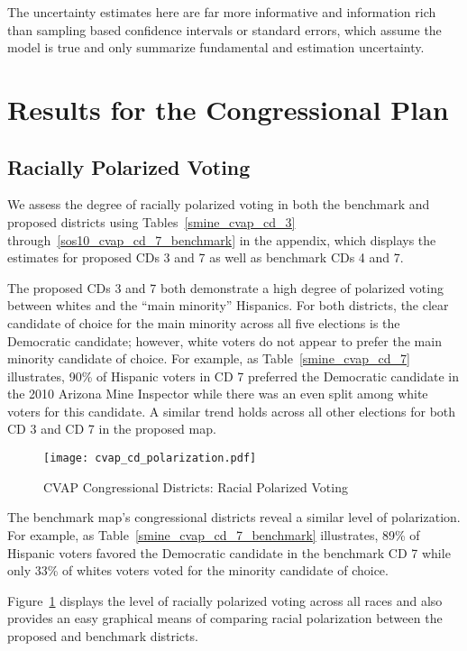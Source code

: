 \documentclass[12pt]{scrartcl}
\begin{document}
The uncertainty estimates here are far more informative and
information rich than sampling based confidence intervals or standard
errors, which assume the model is true and only summarize fundamental
and estimation uncertainty.

\section{Results for the Congressional Plan}

\subsection{Racially Polarized Voting}

We assess the degree of racially polarized voting in both the
benchmark and proposed districts using Tables~\ref{smine_cvap_cd_3}
through~\ref{sos10_cvap_cd_7_benchmark} in the appendix, which
displays the estimates for proposed CDs 3 and 7 as well as benchmark
CDs 4 and 7.

The proposed CDs 3 and 7 both demonstrate a high degree of polarized voting between whites and the ``main minority'' Hispanics. For both districts, the clear candidate of choice for the main minority across all five elections is the Democratic candidate; however, white voters do not appear to prefer the main minority candidate of choice. For example, as Table~\ref{smine_cvap_cd_7} illustrates, 90\% of Hispanic voters in CD 7 preferred the Democratic candidate in the 2010 Arizona Mine Inspector while there was an even split among white voters for this candidate. A similar trend holds across all other elections for both CD 3 and CD 7 in the proposed map.

\begin{figure}[!h]
\begin{centering}
\texttt{[image: cvap\_cd\_polarization.pdf]}
\caption{CVAP Congressional Districts: Racial Polarized Voting}
\end{centering}
\label{cvap_cd_polarization}
\end{figure}

The benchmark map's congressional districts reveal a similar level of polarization. For example, as Table~\ref{smine_cvap_cd_7_benchmark} illustrates, 89\% of Hispanic voters favored the Democratic candidate in the benchmark CD 7 while only 33\% of whites voters voted for the minority candidate of choice.

Figure~\ref{cvap_cd_polarization} displays the level of racially polarized voting across all races and also provides an easy graphical means of comparing racial polarization between the proposed and benchmark districts.
\end{document}
